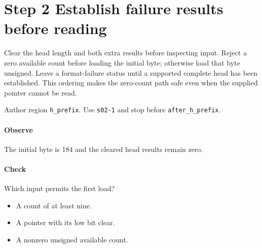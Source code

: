 \section{Step 2 Establish failure results before reading}\label{cbor-s02}
Clear the head length and both extra results before inspecting input. Reject a zero available count before loading the initial byte; otherwise load that byte unsigned. Leave a format-failure status until a supported complete head has been established. This ordering makes the zero-count path safe even when the supplied pointer cannot be read.

Author region \texttt{h\_prefix}. Use \texttt{s02-1} and stop before \texttt{after\_h\_prefix}.

\paragraph{Observe} The initial byte is 184 and the cleared head results remain zero.

\paragraph{Check} Which input permits the first load?
\begin{itemize}
\item[A.] A count of at least nine.
\item[B.] A pointer with its low bit clear.
\item[C.] A nonzero unsigned available count.
\end{itemize}
